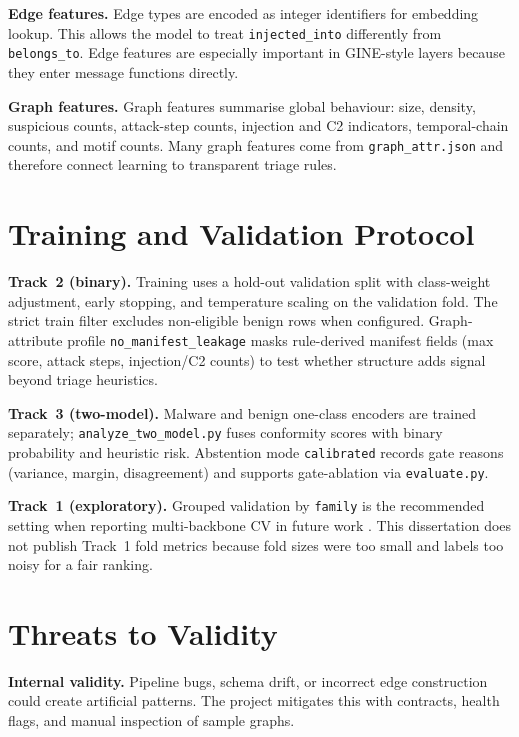 \textbf{Edge features.} Edge types are encoded as integer identifiers for embedding lookup. This allows the model to treat \texttt{injected\_into} differently from \texttt{belongs\_to}. Edge features are especially important in GINE-style layers because they enter message functions directly.

\textbf{Graph features.} Graph features summarise global behaviour: size, density, suspicious counts, attack-step counts, injection and C2 indicators, temporal-chain counts, and motif counts. Many graph features come from \texttt{graph\_attr.json} and therefore connect learning to transparent triage rules.

\section{Training and Validation Protocol}

\textbf{Track~2 (binary).}
Training uses a hold-out validation split with class-weight adjustment, early stopping, and temperature scaling on the validation fold. The strict train filter excludes non-eligible benign rows when configured. Graph-attribute profile \texttt{no\_manifest\_leakage} masks rule-derived manifest fields (max score, attack steps, injection/C2 counts) to test whether structure adds signal beyond triage heuristics.

\textbf{Track~3 (two-model).}
Malware and benign one-class encoders are trained separately; \texttt{analyze\_two\_model.py} fuses conformity scores with binary probability and heuristic risk. Abstention mode \texttt{calibrated} records gate reasons (variance, margin, disagreement) and supports gate-ablation via \texttt{evaluate.py}.

\textbf{Track~1 (exploratory).}
Grouped validation by \texttt{family} is the recommended setting when reporting multi-backbone CV in future work \cite{sommer2010outside}. This dissertation does not publish Track~1 fold metrics because fold sizes were too small and labels too noisy for a fair ranking.

\section{Threats to Validity}

\textbf{Internal validity.} Pipeline bugs, schema drift, or incorrect edge construction could create artificial patterns. The project mitigates this with contracts, health flags, and manual inspection of sample graphs.

